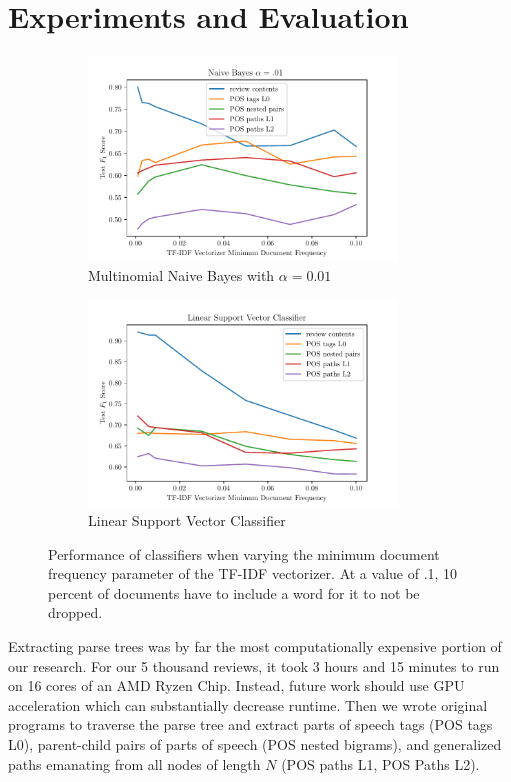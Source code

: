 \documentclass[11pt,a4paper]{article}
\begin{document}
\section{Experiments and Evaluation}
\begin{figure}[h!]
    \centering
     \begin{subfigure}{0.49\textwidth}
    \centering
    \includegraphics[width=8.2cm]{figures/nb_f1_x_min_df.pdf}
         \caption{Multinomial Naive Bayes with $\alpha = 0.01$}
         \label{fig:nb_acc_x_min_df}
     \end{subfigure}
    \hfill
    \begin{subfigure}{0.49\textwidth}
    \centering
    \includegraphics[width=8.2cm]{figures/svc_f1_x_min_df.pdf}
         \caption{Linear Support Vector Classifier}
         \label{fig:svm_acc_x_min_df}
     \end{subfigure}
      \caption{Performance of classifiers when varying the minimum document frequency parameter of the TF-IDF vectorizer. At a value of .1, 10 percent of documents have to include a word for it to not be dropped.}
        \label{fig:clf_acc_x_min_df}
\end{figure}

Extracting parse trees was by far the most computationally expensive portion of our research. For our 5 thousand reviews, it took 3 hours  and 15 minutes to run on 16 cores of an AMD Ryzen Chip. Instead, future work should use GPU acceleration which can substantially decrease runtime.  Then we wrote original programs to traverse the parse tree and extract parts of speech tags (POS tags L0), parent-child pairs of parts of speech (POS nested bigrams), and generalized paths emanating from all nodes of length $N$ (POS paths L1, POS Paths L2).
\end{document}
